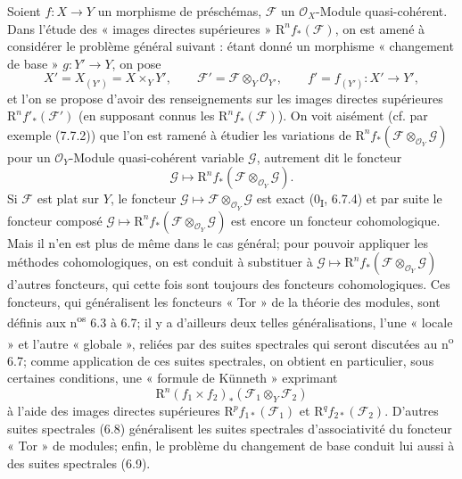 \begin{env}[6.1.1]
Soient $f:X\to Y$ un morphisme de préschémas, $\mathscr F$ un
$\mathscr O_X$-Module quasi-cohérent. Dans l'étude des « images directes
supérieures » $\mathrm R^n f_*(\mathscr F)$, on est amené à considérer le
problème général suivant : étant donné un morphisme « changement de base »
$g:Y'\to Y$, on pose
\[
  X'=X_{(Y')}=X\times_Y Y',\qquad
  \mathscr F'=\mathscr F\otimes_Y\mathscr O_{Y'},\qquad
  f'=f_{(Y')}:X'\to Y',
\]
et l'on se propose d'avoir des renseignements sur les images directes
supérieures $\mathrm R^n f'_*(\mathscr F')$ (en supposant connus les
$\mathrm R^n f_*(\mathscr F)$). On voit aisément (cf. par exemple (7.7.2))
que l'on est ramené à étudier les variations de
$\mathrm R^n f_*(\mathscr F\otimes_{\mathscr O_Y}\mathscr G)$ pour un
$\mathscr O_Y$-Module quasi-cohérent variable $\mathscr G$, autrement dit le
foncteur
\[
  \mathscr G\longmapsto
  \mathrm R^n f_*(\mathscr F\otimes_{\mathscr O_Y}\mathscr G).
\]
Si $\mathscr F$ est plat sur $Y$, le foncteur
$\mathscr G\mapsto\mathscr F\otimes_{\mathscr O_Y}\mathscr G$ est exact
(0\textsubscript{I}, 6.7.4) et par suite le foncteur composé
$\mathscr G\mapsto\mathrm R^n f_*(\mathscr F\otimes_{\mathscr O_Y}\mathscr G)$
est encore un foncteur cohomologique. Mais il n'en est plus de même dans le
cas général; pour pouvoir appliquer les méthodes cohomologiques, on est
conduit à substituer à
$\mathscr G\mapsto\mathrm R^n f_*(\mathscr F\otimes_{\mathscr O_Y}\mathscr G)$
d'autres foncteurs, qui cette fois sont toujours des foncteurs
cohomologiques. Ces foncteurs, qui généralisent les foncteurs « Tor » de la
théorie des modules, sont définis aux n\textsuperscript{os} 6.3 à 6.7; il y a
d'ailleurs deux telles généralisations, l'une « locale » et l'autre
« globale », reliées par des suites spectrales qui seront discutées au
n\textsuperscript{o} 6.7; comme application de ces suites spectrales, on
obtient en particulier, sous certaines conditions, une « formule de Künneth »
exprimant
\[
  \mathrm R^n(f_1\times f_2)_*(\mathscr F_1\otimes_Y\mathscr F_2)
\]
à l'aide des images directes supérieures
$\mathrm R^p f_{1*}(\mathscr F_1)$ et $\mathrm R^q f_{2*}(\mathscr F_2)$.
D'autres suites spectrales (6.8) généralisent les suites spectrales
d'associativité du foncteur « Tor » de modules; enfin, le problème du
changement de base conduit lui aussi à des suites spectrales (6.9).
\end{env}

